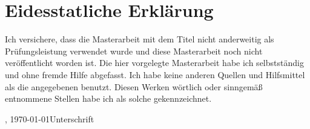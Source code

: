 
\chapter*{Eidesstatliche Erklärung}
\label{sec:EidesstatlicheErklärung}

Ich versichere, dass die Masterarbeit mit dem Titel \glqq{}\titel\grqq{} nicht anderweitig als Prüfungsleistung verwendet wurde und diese Masterarbeit noch nicht veröffentlicht worden ist. Die hier vorgelegte Masterarbeit habe ich selbstständig und ohne fremde Hilfe abgefasst. Ich habe keine anderen Quellen und Hilfsmittel als die angegebenen benutzt. Diesen Werken wörtlich oder sinngemäß entnommene Stellen habe ich als solche gekennzeichnet.
\vfill

\begin{center}
\begin{minipage}{0.9\textwidth}
\ort, \today \hfill  Unterschrift
\end{minipage}
\end{center}



